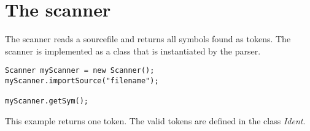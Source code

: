 \section{The scanner}
\label{scanner}
The scanner reads a sourcefile and returns all symbols found as tokens. The
scanner is implemented as a class that is instantiated by the parser. 
\begin{lstlisting}[caption={read a symbol}]
Scanner myScanner = new Scanner();
myScanner.importSource("filename");
	
myScanner.getSym(); 
\end{lstlisting}
This example returns one token. The valid tokens are defined in the class \emph{Ident}.